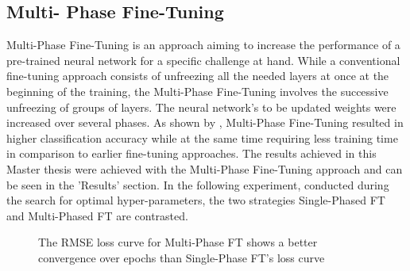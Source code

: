 \subsection{Multi- Phase Fine-Tuning}
Multi-Phase Fine-Tuning is an approach aiming to increase the performance of a pre-trained neural network for a specific challenge at hand. While a conventional fine-tuning approach consists of unfreezing all the needed layers at once at the beginning of the training, the Multi-Phase Fine-Tuning involves the successive unfreezing of groups of layers. The neural network's to be updated weights were increased over several phases. As shown by \citet{Sarhan:2020:MultiPhaseFineTuning}, Multi-Phase Fine-Tuning resulted in higher classification accuracy while at the same time requiring less training time in comparison to earlier fine-tuning approaches.
\newline\newline
The results achieved in this Master thesis were achieved with the Multi-Phase Fine-Tuning approach and can be seen in the 'Results' section. In the following experiment, conducted during the search for optimal hyper-parameters, the two strategies Single-Phased FT and Multi-Phased FT are contrasted.

\begin{figure}[H]
  \centering
  \hfill
  \caption{The RMSE loss curve for Multi-Phase FT shows a better convergence over epochs than Single-Phase FT's loss curve}
  \label{fig:SPFTvsMPFT}
\end{figure}

